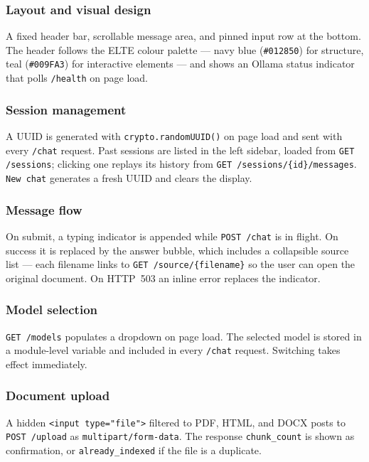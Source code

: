 \subsubsection*{Layout and visual design}

A fixed header bar, scrollable message area, and pinned input row at the
bottom. The header follows the ELTE colour palette — navy blue
(\texttt{\#012850}) for structure, teal (\texttt{\#009FA3}) for interactive
elements — and shows an Ollama status indicator that polls \texttt{/health}
on page load.

\subsubsection*{Session management}

A UUID is generated with \texttt{crypto.randomUUID()} on page load and sent
with every \texttt{/chat} request. Past sessions are listed in the left
sidebar, loaded from \texttt{GET /sessions}; clicking one replays its history
from \texttt{GET /sessions/\{id\}/messages}. \texttt{New chat} generates a
fresh UUID and clears the display.

\subsubsection*{Message flow}

On submit, a typing indicator is appended while \texttt{POST /chat} is in
flight. On success it is replaced by the answer bubble, which includes a
collapsible source list — each filename links to \texttt{GET
/source/\{filename\}} so the user can open the original document. On HTTP~503
an inline error replaces the indicator.

\subsubsection*{Model selection}

\texttt{GET /models} populates a dropdown on page load. The selected model is
stored in a module-level variable and included in every \texttt{/chat}
request. Switching takes effect immediately.

\subsubsection*{Document upload}

A hidden \texttt{<input type="file">} filtered to PDF, HTML, and DOCX posts
to \texttt{POST /upload} as \texttt{multipart/form-data}. The response
\texttt{chunk\_count} is shown as confirmation, or \texttt{already\_indexed}
if the file is a duplicate.

